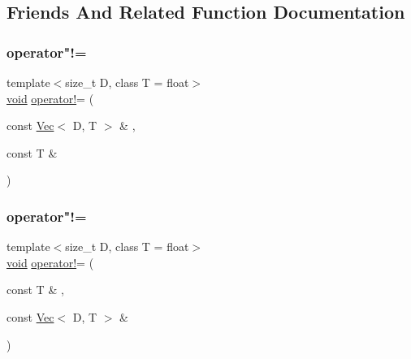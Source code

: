 \subsection{Friends And Related Function Documentation}
\mbox{\label{classtrimesh_1_1Vec_ab3d8d3e2b3719cc9a73f7495bd527e21}} 
\subsubsection{\texorpdfstring{operator"!=}{operator!=}\hspace{0.1cm}{\footnotesize\ttfamily [1/2]}}
{\footnotesize\ttfamily template$<$size\+\_\+t D, class T = float$>$ \\
\hyperlink{namespacetrimesh_a784ddfd979e1c579bda795a8edfc3f43}{void} \hyperlink{namespacetrimesh_af767195cb37f08a930059365eb736329}{operator!}= (\begin{DoxyParamCaption}\item[{const \hyperlink{classtrimesh_1_1Vec}{Vec}$<$ D, T $>$ \&}]{,  }\item[{const T \&}]{ }\end{DoxyParamCaption})\hspace{0.3cm}{\ttfamily [friend]}}

\mbox{\label{classtrimesh_1_1Vec_a326a6a568c33a88dabee601c163455ee}} 
\subsubsection{\texorpdfstring{operator"!=}{operator!=}\hspace{0.1cm}{\footnotesize\ttfamily [2/2]}}
{\footnotesize\ttfamily template$<$size\+\_\+t D, class T = float$>$ \\
\hyperlink{namespacetrimesh_a784ddfd979e1c579bda795a8edfc3f43}{void} \hyperlink{namespacetrimesh_af767195cb37f08a930059365eb736329}{operator!}= (\begin{DoxyParamCaption}\item[{const T \&}]{,  }\item[{const \hyperlink{classtrimesh_1_1Vec}{Vec}$<$ D, T $>$ \&}]{ }\end{DoxyParamCaption})\hspace{0.3cm}{\ttfamily [friend]}}

